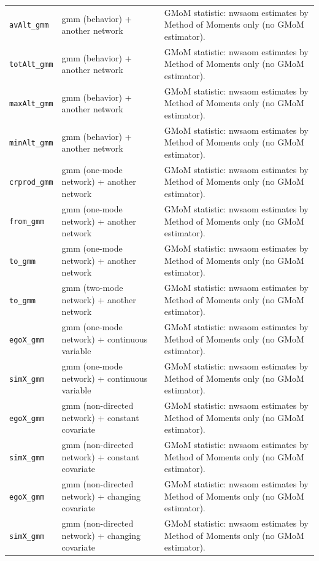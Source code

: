 \begin{longtable}{@{}p{2.8cm}p{4.6cm}p{6.5cm}@{}}
\texttt{avAlt\_gmm} & gmm (behavior) + another network & GMoM statistic: nwsaom estimates by Method of Moments only (no GMoM estimator).\\
\texttt{totAlt\_gmm} & gmm (behavior) + another network & GMoM statistic: nwsaom estimates by Method of Moments only (no GMoM estimator).\\
\texttt{maxAlt\_gmm} & gmm (behavior) + another network & GMoM statistic: nwsaom estimates by Method of Moments only (no GMoM estimator).\\
\texttt{minAlt\_gmm} & gmm (behavior) + another network & GMoM statistic: nwsaom estimates by Method of Moments only (no GMoM estimator).\\
\texttt{crprod\_gmm} & gmm (one-mode network) + another network & GMoM statistic: nwsaom estimates by Method of Moments only (no GMoM estimator).\\
\texttt{from\_gmm} & gmm (one-mode network) + another network & GMoM statistic: nwsaom estimates by Method of Moments only (no GMoM estimator).\\
\texttt{to\_gmm} & gmm (one-mode network) + another network & GMoM statistic: nwsaom estimates by Method of Moments only (no GMoM estimator).\\
\texttt{to\_gmm} & gmm (two-mode network) + another network & GMoM statistic: nwsaom estimates by Method of Moments only (no GMoM estimator).\\
\texttt{egoX\_gmm} & gmm (one-mode network) + continuous variable & GMoM statistic: nwsaom estimates by Method of Moments only (no GMoM estimator).\\
\texttt{simX\_gmm} & gmm (one-mode network) + continuous variable & GMoM statistic: nwsaom estimates by Method of Moments only (no GMoM estimator).\\
\texttt{egoX\_gmm} & gmm (non-directed network) + constant covariate & GMoM statistic: nwsaom estimates by Method of Moments only (no GMoM estimator).\\
\texttt{simX\_gmm} & gmm (non-directed network) + constant covariate & GMoM statistic: nwsaom estimates by Method of Moments only (no GMoM estimator).\\
\texttt{egoX\_gmm} & gmm (non-directed network) + changing covariate & GMoM statistic: nwsaom estimates by Method of Moments only (no GMoM estimator).\\
\texttt{simX\_gmm} & gmm (non-directed network) + changing covariate & GMoM statistic: nwsaom estimates by Method of Moments only (no GMoM estimator).\\

\end{longtable}
